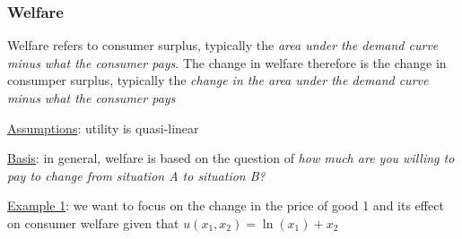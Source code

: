 \documentclass{article}
\begin{document}
\subsubsection{Welfare}
Welfare refers to consumer surplus, typically the \textit{area under the demand curve minus what the consumer pays}. The change in welfare therefore is the change in consumper surplus, typically the \textit{change in the area under the demand curve minus what the consumer pays} \par \vspace{0.3em}
  \underline{Assumptions}: utility is quasi-linear
  \par
  \underline{Basis}: in general, welfare is based on the question of \textit{how much are you willing to pay to change from situation A to situation B?}
  \par
  \underline{Example 1}: we want to focus on the change in the price of good 1 and its effect on consumer welfare given that $u(x_{1}, x_{2}) = \ln(x_{1}) + x_{2}$
\end{document}
